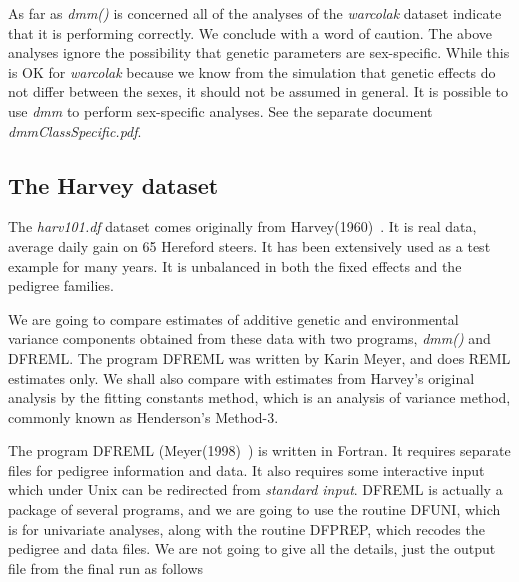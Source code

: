 \documentclass[titlepage]{article}  %
\begin{document}
As far as {\em dmm()} is concerned all of the analyses of the {\em warcolak} dataset indicate that it is performing correctly. We conclude with a word of caution. The above analyses ignore the possibility that genetic parameters are sex-specific. While this is OK for {\em warcolak} because we know from the simulation that genetic effects do not differ between the sexes, it should not be assumed in general. It is possible to use {\em dmm} to perform sex-specific analyses. See the separate document {\em dmmClassSpecific.pdf}. 

\clearpage
\subsection{The Harvey dataset}
 The {\em harv101.df} dataset comes originally from Harvey(1960)~\cite{harv:60}. It is real data, average daily gain on 65 Hereford steers. It has been extensively used as a test example for many years. It is unbalanced in both the fixed effects and the pedigree families.

We are going to compare estimates of additive genetic and environmental variance components obtained from these data with two programs, {\em dmm()} and DFREML. The program DFREML was written by Karin Meyer, and does REML estimates only. We shall also compare with estimates from Harvey's original analysis by the fitting constants method, which is an analysis of variance method, commonly known as Henderson's Method-3.

The program DFREML (Meyer(1998)~\cite{meye:98}) is written in Fortran. It requires separate files for pedigree information and data. It also requires some interactive input which under Unix can be redirected from {\em standard input}. DFREML is actually a package of several programs, and we are going to use the routine DFUNI, which is for univariate analyses, along with the routine DFPREP, which recodes the pedigree and data files. We are not going to give all the details, just the output file from the final run as follows
\end{document}
